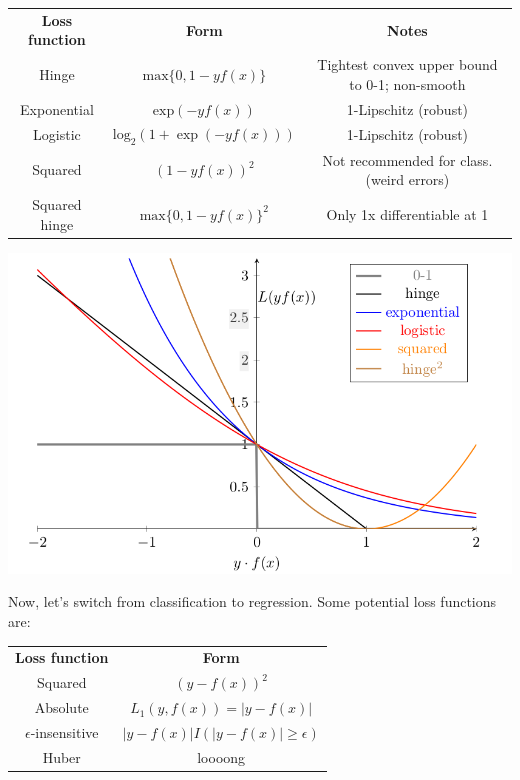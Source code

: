 \documentclass{article}
\begin{document}
\begin{table}[h]
	\centering
	\begin{tabular}{|c | c | c|}
		\hline
		\textbf{Loss function} & \textbf{Form} & \textbf{Notes}\\
		Hinge & $\mathrm{max}\{0, 1-yf(x)\}$ & Tightest convex upper bound to 0-1; non-smooth\\
		Exponential &  $ \mathrm{exp}(-yf(x))$ & 1-Lipschitz (robust)\\
		Logistic & $ \mathrm{log}_2(1+\exp(-yf(x)))$ & 1-Lipschitz (robust)\\
		Squared & $(1-yf(x))^2$ & Not recommended for class. (weird errors)\\
		Squared hinge &  $\mathrm{max}\{0, 1-yf(x)\}^2$ & Only 1x differentiable
		at 1\\
		\hline
	\end{tabular}
\end{table}
\begin{centering}
\includegraphics[scale=0.35]{graph}
\end{centering}

Now, let's switch from classification to regression. Some potential loss
functions are:

\begin{table}[h]
	\centering
	\begin{tabular}{|c | c |}
		\hline
		\textbf{Loss function} & \textbf{Form} \\
		Squared & $(y-f(x))^2$  \\
		Absolute & $L_1(y, f(x)) = |y-f(x)|$\\
		$\epsilon$-insensitive & $|y-f(x)|I(|y-f(x)|\geq \epsilon)$ \\
		Huber & loooong \\
		\hline
	\end{tabular}
\end{table}
\end{document}
